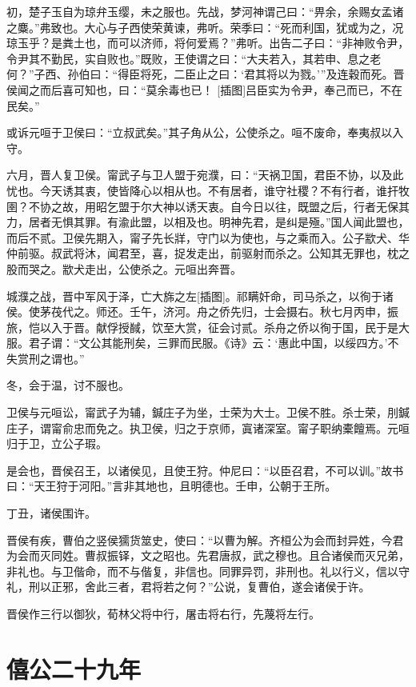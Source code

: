 \documentclass[a4paper,12pt,UTF8,twoside]{ctexbook}
\begin{document}
初，楚子玉自为琼弁玉缨，未之服也。先战，梦河神谓己曰：“畀余，余赐女孟诸之麋。”弗致也。大心与子西使荣黄谏，弗听。荣季曰：“死而利国，犹或为之，况琼玉乎？是粪土也，而可以济师，将何爱焉？”弗听。出告二子曰：“非神败令尹，令尹其不勤民，实自败也。”既败，王使谓之曰：“大夫若入，其若申、息之老何？”子西、孙伯曰：“得臣将死，二臣止之曰：‘君其将以为戮。’”及连穀而死。晋侯闻之而后喜可知也，曰：“莫余毒也已！ [插图]吕臣实为令尹，奉己而已，不在民矣。”

或诉元咺于卫侯曰：“立叔武矣。”其子角从公，公使杀之。咺不废命，奉夷叔以入守。

六月，晋人复卫侯。甯武子与卫人盟于宛濮，曰：“天祸卫国，君臣不协，以及此忧也。今天诱其衷，使皆降心以相从也。不有居者，谁守社稷？不有行者，谁扞牧圉？不协之故，用昭乞盟于尔大神以诱天衷。自今日以往，既盟之后，行者无保其力，居者无惧其罪。有渝此盟，以相及也。明神先君，是纠是殛。”国人闻此盟也，而后不贰。卫侯先期入，甯子先长牂，守门以为使也，与之乘而入。公子歂犬、华仲前驱。叔武将沐，闻君至，喜，捉发走出，前驱射而杀之。公知其无罪也，枕之股而哭之。歂犬走出，公使杀之。元咺出奔晋。

城濮之战，晋中军风于泽，亡大旆之左[插图]。祁瞒奸命，司马杀之，以徇于诸侯。使茅茷代之。师还。壬午，济河。舟之侨先归，士会摄右。秋七月丙申，振旅，恺以入于晋。献俘授馘，饮至大赏，征会讨贰。杀舟之侨以徇于国，民于是大服。君子谓：“文公其能刑矣，三罪而民服。《诗》云：‘惠此中国，以绥四方。’不失赏刑之谓也。”

冬，会于温，讨不服也。

卫侯与元咺讼，甯武子为辅，鍼庄子为坐，士荣为大士。卫侯不胜。杀士荣，刖鍼庄子，谓甯俞忠而免之。执卫侯，归之于京师，寘诸深室。甯子职纳橐饘焉。元咺归于卫，立公子瑕。

是会也，晋侯召王，以诸侯见，且使王狩。仲尼曰：“以臣召君，不可以训。”故书曰：“天王狩于河阳。”言非其地也，且明德也。壬申，公朝于王所。

丁丑，诸侯围许。

晋侯有疾，曹伯之竖侯獳货筮史，使曰：“以曹为解。齐桓公为会而封异姓，今君为会而灭同姓。曹叔振铎，文之昭也。先君唐叔，武之穆也。且合诸侯而灭兄弟，非礼也。与卫偕命，而不与偕复，非信也。同罪异罚，非刑也。礼以行义，信以守礼，刑以正邪，舍此三者，君将若之何？”公说，复曹伯，遂会诸侯于许。

晋侯作三行以御狄，荀林父将中行，屠击将右行，先蔑将左行。

\chapter{僖公二十九年}
\end{document}

